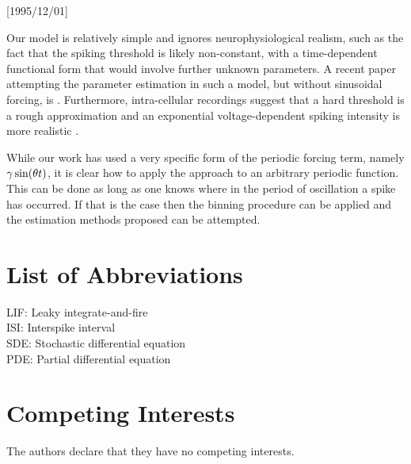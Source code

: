 \NeedsTeXFormat{LaTeX2e}[1995/12/01] \documentclass[10pt]{bmc_article}
\newenvironment{bmcformat}{\begin{raggedright}\baselineskip20pt\sloppy\setboolean{publ}{false}}{\end{raggedright}\baselineskip20pt\sloppy}
\begin{document}
\begin{bmcformat}
Our model is relatively simple and ignores neurophysiological realism, such as
the fact that the spiking threshold is likely non-constant, with a
time-dependent functional form that would involve further unknown parameters. A
recent paper attempting the parameter estimation in such a model, but without
sinusoidal forcing, is \cite{Dong2011}. Furthermore, intra-cellular recordings
suggest that a hard threshold is a rough approximation and an exponential
voltage-dependent spiking intensity is more realistic \cite{Jahn2011}.

While our work has used a very specific form of the periodic forcing term,
namely ${\gamma } \sin({\theta} t)$,  it is clear how to apply the approach to an arbitrary
periodic function. This can be done as long as one knows where in the period of
oscillation a spike has occurred. If that is the case then the binning procedure
can be applied and the estimation methods proposed can be attempted. 

\section*{List of Abbreviations}  
LIF: Leaky integrate-and-fire \\
ISI: Interspike interval \\
SDE: Stochastic differential equation\\
PDE: Partial differential equation\\
\section*{Competing Interests}
The authors declare that they have no competing interests.

\end{bmcformat}
\end{document}
